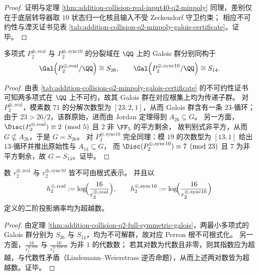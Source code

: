 \begin{proof}
证明与定理 \ref{thm:addition-collision-real-input40-q2-minpoly} 同理，差别仅在于底层转导器取 \(10\) 状态归一化核且输入不受 Zeckendorf 守卫约束；
相应不可约性与湮灭证书见表 \ref{tab:addition-collision-q2-minpoly-galois-certificate}。证毕。
\end{proof}

\begin{theorem}\label{thm:addition-collision-q2-full-symmetric-galois}
多项式 \(P^{\oplus,\mathrm{real}}_2\) 与 \(P^{\oplus,\mathrm{sync10}}_2\) 的分裂域在 \(\QQ\) 上的 Galois 群分别同构于
\[
\Gal\!\left(P^{\oplus,\mathrm{real}}_2/\QQ\right)\cong S_{26},
\qquad
\Gal\!\left(P^{\oplus,\mathrm{sync10}}_2/\QQ\right)\cong S_{14}.
\]
\end{theorem}

\begin{proof}
由表 \ref{tab:addition-collision-q2-minpoly-galois-certificate} 的不可约性证书可知两多项式在 \(\QQ\) 上不可约，故其 Galois 群在对应根集上均为传递子群。
对 \(P^{\oplus,\mathrm{real}}_2\)，模素数 \(71\) 的分解次数型为 \([23,2,1]\)，从而 Galois 群含有一条 \(23\)-循环；
由于 \(23>26/2\)，该群原始，进而由 Jordan 定理得到 \(A_{26}\subseteq G\)。
另一方面，\(\Disc(P^{\oplus,\mathrm{real}}_2)\equiv 2\pmod{5}\) 且 \(2\) 非 \(\FF_{5}\) 的平方剩余，
故判别式非平方，从而 \(G\nsubseteq A_{26}\)，于是 \(G=S_{26}\)。
对 \(P^{\oplus,\mathrm{sync10}}_2\) 完全同理：模 \(19\) 的次数型为 \([13,1]\) 给出 \(13\)-循环并推出原始性与 \(A_{14}\subseteq G\)，
而 \(\Disc(P^{\oplus,\mathrm{sync10}}_2)\equiv 7\pmod{23}\) 且 \(7\) 为非平方剩余，故 \(G=S_{14}\)。证毕。
\end{proof}

\begin{corollary}[不可根式化与二阶投影熵率的超越性]\label{cor:addition-collision-q2-nonradical-transcendental}
数 \(r^{\oplus,\mathrm{real}}_2\) 与 \(r^{\oplus,\mathrm{sync10}}_2\) 皆不可由根式表示。
并且以
\[
h^{\oplus,\mathrm{real}}_2:=\log\!\Bigl(\frac{16}{r^{\oplus,\mathrm{real}}_2}\Bigr),
\qquad
h^{\oplus,\mathrm{sync10}}_2:=\log\!\Bigl(\frac{16}{r^{\oplus,\mathrm{sync10}}_2}\Bigr)
\]
定义的二阶投影熵率均为超越数。
\end{corollary}

\begin{proof}
由定理 \ref{thm:addition-collision-q2-full-symmetric-galois}，两最小多项式的 Galois 群分别为 \(S_{26}\) 与 \(S_{14}\)，均为不可解群，故对应 Perron 根不可根式化。
另一方面，\(\frac{16}{r^{\oplus,\mathrm{real}}_2}\) 与 \(\frac{16}{r^{\oplus,\mathrm{sync10}}_2}\) 为非 \(1\) 的代数数；
若其对数为代数且非零，则其指数应为超越，与代数性矛盾（Lindemann--Weierstrass 逆否命题），从而上述两对数皆为超越数。证毕。
\end{proof}

